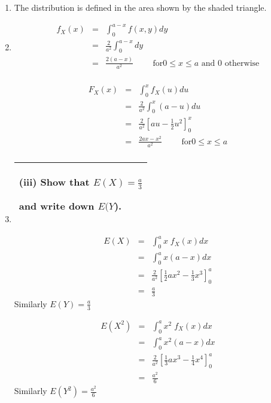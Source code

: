 \documentclass[a4paper,12pt]{article}
\begin{document}
\begin{enumerate}
\item The distribution is defined in the area shown by the shaded triangle.

\item  \begin{eqnarray*}
f_X(x)
&=& \int^{a-x}_{0} f(x,y) dy \\
&=&  \frac{2}{a^2} \int^{a-x}_{0} dy \\
&=& \frac{2(a-x)}{a^2} \qquad \mbox{ for}  0 \leq x \leq a \mbox{ and } 0 \mbox{ otherwise} \\
\end{eqnarray*}

\begin{eqnarray*}
F_X(x) 
&=& \int^{x}_{0}f_X(u)du \\
&=& \frac{2}{a^2} \int^{x}_{0} (a-u) du \\ 
&=& \frac{2}{a^2}\left[ au - \frac{1}{2} u^2 \right]^{x}_{0} \\
&=& \frac{2ax-x^2}{a^2} \qquad \mbox{ for} 0 \leq x \leq a \\
\end{eqnarray*}
\item  

\newpage
  \begin{table}[ht!]
     \centering
     \begin{tabular}{|p{15cm}|}
     \hline    
(iii) Show that $E(X) = \frac{a}{3}$

 and write down $E(Y$).         
\\ \hline
\end{tabular}
\end{table}

\begin{eqnarray*}
E(X) &=& \int^{a}_{0} x \;f_X(x) dx \\
    &=&\int^{a}_{0} x(a-x) dx \\
    &=&  \frac{2}{a^2}\left[ \frac{1}{2}ax^2 - \frac{1}{3}x^3  \right]^{a}_{0}\\
    &=& \frac{a}{3}  
\end{eqnarray*}
Similarly $E(Y) = \frac{a}{3} $

\begin{eqnarray*}
E(X^2) &=& \int^{a}_{0} x^2 \;f_X(x) dx \\
    &=&\int^{a}_{0} x^2(a-x) dx \\
    &=&  \frac{2}{a^2}\left[ \frac{1}{3}ax^3 - \frac{1}{4}x^4  \right]^{a}_{0}\\
    &=& \frac{a^2}{6}  
\end{eqnarray*}
Similarly $E(Y^2) = \frac{a^2}{6} $


\end{enumerate}
\end{document}
